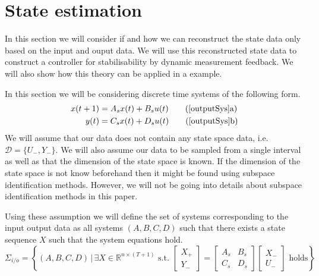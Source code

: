 \section{State estimation}
In this section we will consider if and how we can reconstruct the state data only based on the input and ouput data. We will use this reconstructed state data to construct a controller for stabilisability by dynamic measurement feedback. We will also show how this theory can be applied in a example.



In this section we will be considering discrete time systems of the following form.
\begin{subequations}
	\begin{align} 
	x(t+1) &= A_s x(t) + B_s u(t) \tag{\ref{outputSys}a} \\
	y(t)   &= C_s x(t) + D_s u(t) \tag{\ref{outputSys}b}
	\end{align}
\end{subequations}
We will assume that our data does not contain any state space data, i.e. $\mathcal{D} = \{ U_-,Y_- \}$. We will also assume our data to be sampled from a single interval as well as that the dimension of the state space is known. If the dimension of the state space is not know beforehand then it might be found using subspace identification methods. However, we will not be going into details about subspace identification methods in this paper.

Using these assumption we will define the set of systems corresponding to the input output data as all systems $(A,B,C,D)$ such that there exists a state sequence $X$ such that the system equations hold. 
\begin{equation*}
	\Sigma_{i/o} = \left\{ (A,B,C,D) \, | \, \exists X \in \mathbb{R}^{n \times (T+1)} \mbox{ s.t. } \begin{bmatrix} X_{+} \\ Y_{-} \end{bmatrix} = \begin{bmatrix} A_s & B_s \\ C_s & D_s \end{bmatrix} \begin{bmatrix} X_{-} \\ U_{-} \end{bmatrix} \mbox{ holds} \right\}
\end{equation*}

